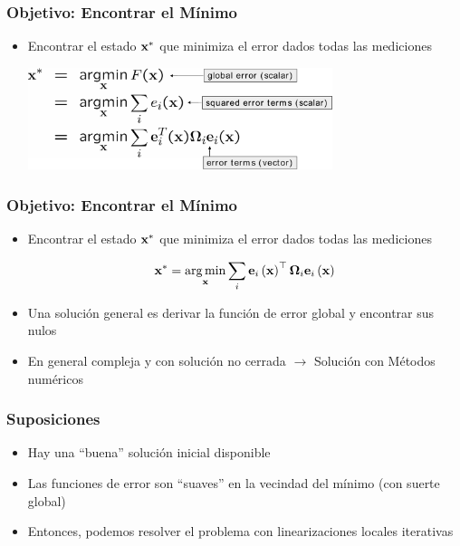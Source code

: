 \begin{frame}
    \frametitle{Objetivo: Encontrar el Mínimo}
    
    \begin{itemize}
        \item Encontrar el estado $\boldsymbol{\mathbf{x}}^{*}$ que minimiza el error dados todas las mediciones
        
        \begin{center}
            \includegraphics[width=0.7\textwidth]{images/find_minimum.pdf}
        \end{center}
    \end{itemize}

\end{frame}

\begin{frame}
    \frametitle{Objetivo: Encontrar el Mínimo}
    
    \begin{itemize}
        \item Encontrar el estado $\boldsymbol{\mathbf{x}}^{*}$ que minimiza el error dados todas las mediciones
        
        \begin{equation*}
            \boldsymbol{\mathbf{x}}^{*} = \operatorname*{arg\,min}_{\boldsymbol{\mathbf{x}}} \sum_{i} \boldsymbol{\mathbf{e}}_{i}\left( \boldsymbol{\mathbf{x}} \right)^{\top} \boldsymbol{\mathbf{\Omega}}_{i} \boldsymbol{\mathbf{e}}_{i}\left( \boldsymbol{\mathbf{x}} \right)
        \end{equation*}
        
        
        \item Una solución general es derivar la función de error global y encontrar sus nulos
        \item En general compleja y con solución no cerrada $\rightarrow$ Solución con Métodos numéricos
    \end{itemize}
    
\end{frame}


\begin{frame}
    \frametitle{Suposiciones}
    \begin{itemize}
        \item Hay una ``buena'' solución inicial disponible
        \item Las funciones de error son ``suaves'' en la vecindad del mínimo (con suerte global)
        \item Entonces, podemos resolver el problema con linearizaciones locales iterativas
    \end{itemize}

\end{frame}

